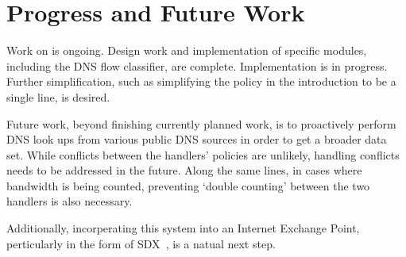 \section{Progress and Future Work}
Work on \system{} is ongoing. Design work and implementation of specific modules, including the DNS flow classifier, are complete. Implementation is in progress. Further simplification, such as simplifying the policy in the introduction to be a single line, is desired.



Future work, beyond finishing currently planned work, is to proactively perform DNS look ups from various public DNS sources in order to get a broader data set. While conflicts between the handlers' policies are unlikely, handling conflicts needs to be addressed in the future. Along the same lines, in cases where bandwidth is being counted, preventing `double counting' between the two handlers is also necessary.

Additionally, incorperating this system into an Internet Exchange Point, perticularly in the form of SDX~\cite{sdx}, is a natual next step.



